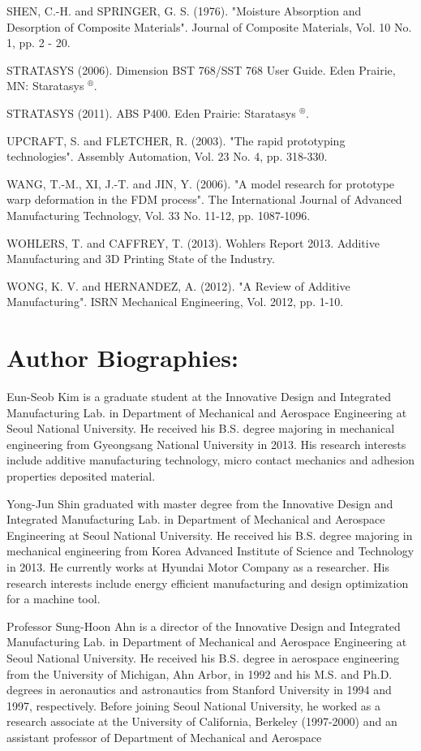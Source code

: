 \documentclass[10pt]{article}
\begin{document}
SHEN, C.-H. and SPRINGER, G. S. (1976). "Moisture Absorption and Desorption of Composite Materials". Journal of Composite Materials, Vol. 10 No. 1, pp. 2 - 20.

STRATASYS (2006). Dimension BST 768/SST 768 User Guide. Eden Prairie, MN: Staratasys ${ }^{\circledR}$.

STRATASYS (2011). ABS P400. Eden Prairie: Staratasys ${ }^{\circledR}$.

UPCRAFT, S. and FLETCHER, R. (2003). "The rapid prototyping technologies". Assembly Automation, Vol. 23 No. 4, pp. 318-330.

WANG, T.-M., XI, J.-T. and JIN, Y. (2006). "A model research for prototype warp deformation in the FDM process". The International Journal of Advanced Manufacturing Technology, Vol. 33 No. 11-12, pp. 1087-1096.

WOHLERS, T. and CAFFREY, T. (2013). Wohlers Report 2013. Additive Manufacturing and 3D Printing State of the Industry.

WONG, K. V. and HERNANDEZ, A. (2012). "A Review of Additive Manufacturing". ISRN Mechanical Engineering, Vol. 2012, pp. 1-10.

\section*{Author Biographies:}
Eun-Seob Kim is a graduate student at the Innovative Design and Integrated Manufacturing Lab. in Department of Mechanical and Aerospace Engineering at Seoul National University. He received his B.S. degree majoring in mechanical engineering from Gyeongsang National University in 2013. His research interests include additive manufacturing technology, micro contact mechanics and adhesion properties deposited material.

Yong-Jun Shin graduated with master degree from the Innovative Design and Integrated Manufacturing Lab. in Department of Mechanical and Aerospace Engineering at Seoul National University. He received his B.S. degree majoring in mechanical engineering from Korea Advanced Institute of Science and Technology in 2013. He currently works at Hyundai Motor Company as a researcher. His research interests include energy efficient manufacturing and design optimization for a machine tool.

Professor Sung-Hoon Ahn is a director of the Innovative Design and Integrated Manufacturing Lab. in Department of Mechanical and Aerospace Engineering at Seoul National University. He received his B.S. degree in aerospace engineering from the University of Michigan, Ahn Arbor, in 1992 and his M.S. and Ph.D. degrees in aeronautics and astronautics from Stanford University in 1994 and 1997, respectively. Before joining Seoul National University, he worked as a research associate at the University of California, Berkeley (1997-2000) and an assistant professor of Department of Mechanical and Aerospace
\end{document}
